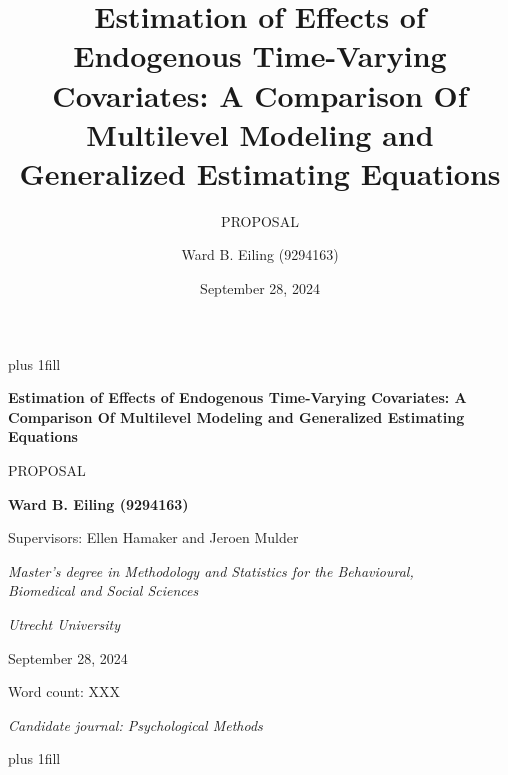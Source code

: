 \documentclass[
  12pt,
  a4paper,
]{article}
\title{Estimation of Effects of Endogenous Time-Varying Covariates: A
Comparison Of Multilevel Modeling and Generalized Estimating Equations}
\subtitle{PROPOSAL}
\author{Ward B. Eiling (9294163)}
\date{September 28, 2024}
\begin{document}
\cleardoublepage
\thispagestyle{empty}
{\centering
\hbox{}\vskip 0cm plus 1fill
{\Large\bfseries Estimation of Effects of Endogenous Time-Varying
Covariates: A Comparison Of Multilevel Modeling and Generalized
Estimating Equations \par}
\vspace{3ex}
{\large PROPOSAL \par}
\vspace{9ex}
{\large\bfseries Ward B. Eiling (9294163) \par}
\vspace{3ex}
{\large Supervisors: Ellen Hamaker and Jeroen Mulder \par}
\vspace{9ex}
{\normalsize \textit{Master's degree in Methodology and Statistics for the Behavioural, \\ Biomedical and Social Sciences} \par}
\vspace{3ex}
{\normalsize \textit{Utrecht University} \par}
\vspace{9ex}
{\normalsize September 28, 2024 \par}
\vspace{3ex}
{\normalsize Word count: XXX \par}
\vspace{9ex}
{\normalsize \textit{Candidate journal: Psychological Methods} \par}
\hbox{}\vskip 0cm plus 1fill
}
\ifdefined\Shaded\renewenvironment{Shaded}{\begin{tcolorbox}[boxrule=0pt, interior hidden, enhanced, sharp corners, frame hidden, breakable, borderline west={3pt}{0pt}{shadecolor}]}{\end{tcolorbox}}\fi
\end{document}
